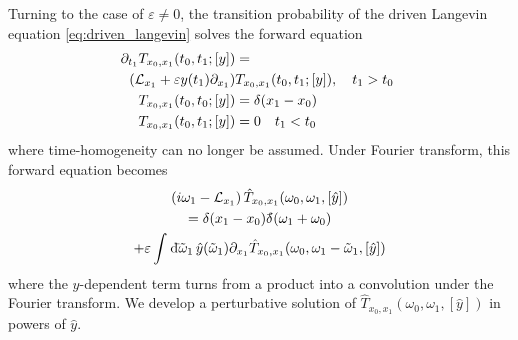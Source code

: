 \documentclass[%
 reprint,
superscriptaddress,
nofootinbib,
 amsmath,amssymb,
 aps,
prx,
]{revtex4-2}
\begin{document}
Turning to the case of $\varepsilon\neq 0$, the transition probability of the driven Langevin equation \eqref{eq:driven_langevin} solves the forward equation
\begin{align}
\partial_{t_1} T_{x_0,x_1}(t_0,t_1;[y]) &=\nonumber\\
\left( \mathcal{L}_{x_1} + \varepsilon y(t_1) \partial_{x_1}\right) &T_{x_0,x_1}(t_0,t_1;[y]), \quad t_1>t_0\nonumber\  \\
T_{x_0,x_1}(t_0, t_0;[y]) &= \delta(x_1 - x_0)\nonumber\\\
T_{x_0,x_1}(t_0, t_1;[y])&=0\quad t_1<t_0
		\label{}
\end{align}
where time-homogeneity can no longer be assumed.
Under Fourier transform, this forward equation becomes
\begin{multline}
	\left( i\omega_1 - \mathcal{L}_{x_1} \right) \hat{T}_{x_0,x_1}(\omega_0, \omega_1,[\hat{y}])\\
	= \delta(x_1 - x_0)\delta\hspace*{-0.24em}\bar{}\hspace*{0.1em}\,(\omega_1+\omega_0)\\
	+  \varepsilon \int_{}^{} \mathrm{d}\hspace*{-0.08em}\bar{}\hspace*{0.1em} \tilde{\omega}_1 \, \hat{y}(\tilde{\omega}_1) \partial_{x_1}\hat{T}_{x_0,x_1}(\omega_0,\omega_1-\tilde{\omega}_1,[\hat{y}])
	\label{eq:laplace_trafo_forward_y} 
\end{multline}
where the $y$-dependent term turns from a product into a convolution under the Fourier transform.
We develop a perturbative solution of $\hat{T}_{x_0,x_1}(\omega_0,\omega_1,[\hat{y}])$ in powers of $\hat{y}$. 
\end{document}
